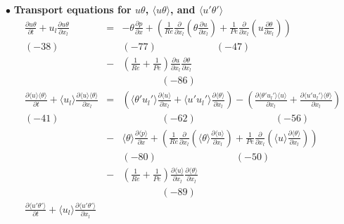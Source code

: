 \documentclass[a4paper,11pt]{article}
\begin{document}
\noindent $\bullet$  \textbf{Transport equations for $u\theta$, $\langle u\theta\rangle$, and $\langle u'\theta'\rangle$}
\begin{eqnarray}
\frac{\partial u\theta }{\partial t}
+u_l\frac{\partial u\theta }{\partial x_l}
&=&-\theta \frac{\partial p }{\partial x}
+(\frac{1}{Re}\frac{\partial }{\partial x_l}(\theta\frac{\partial u }{\partial x_l})+\frac{1}{Pe}\frac{\partial }{\partial x_l}(u\frac{\partial \theta }{\partial x_l}) )\nonumber \\
(-38)    && (-77) \qquad{} \quad{}\quad{} \qquad{} (-47) \nonumber \\
&-&(\frac{1}{Re}+\frac{1}{Pe})\frac{\partial u }{\partial x_l}\frac{\partial \theta }{\partial x_l}  \\ 
 &&  \qquad{} \qquad{} (-86) \nonumber \\
\frac{\partial \langle u\rangle \langle \theta\rangle }{\partial t}
+\langle u_l\rangle \frac{\partial \langle u\rangle \langle \theta\rangle }{\partial x_l}
&=&(\langle \theta'u_l'\rangle \frac{\partial \langle u \rangle}{\partial x_l}+\langle u'u_l'\rangle \frac{\partial \langle \theta \rangle  }{\partial x_l})
-(\frac{\partial \langle \theta'u_l'\rangle \langle u \rangle }{\partial x_l}+\frac{\partial \langle u'u_l'\rangle \langle \theta \rangle }{\partial x_l}) \nonumber \\
(-41) \quad{}   && \qquad{} \qquad{} (-62)\quad{}\quad{}\quad{} \qquad{}\quad{}\qquad{} (-56) \nonumber \\
&-&\langle \theta  \rangle \frac{\partial \langle p \rangle }{\partial x} 
+(\frac{1}{Re}\frac{\partial}{\partial x_l}(\langle \theta\rangle \frac{\partial \langle u\rangle}{\partial x_l}) + \frac{1}{Pe}\frac{\partial}{\partial x_l}(\langle u \rangle \frac{\partial \langle \theta\rangle}{\partial x_l})) \nonumber \\
 && (-80) \qquad{} \qquad{} \quad{}\quad{}\qquad{} (-50) \nonumber \\
&-&(\frac{1}{Re}+\frac{1}{Pe})\frac{\partial \langle u\rangle }{\partial x_l}\frac{\partial \langle \theta \rangle}{\partial x_l} \\
&&  \qquad{} \qquad{} (-89) \nonumber \\
\frac{\partial \langle u'\theta'\rangle }{\partial t}
+\langle u_l\rangle \frac{\partial \langle u'\theta'\rangle }{\partial x_l}

\end{eqnarray}
\end{document}
